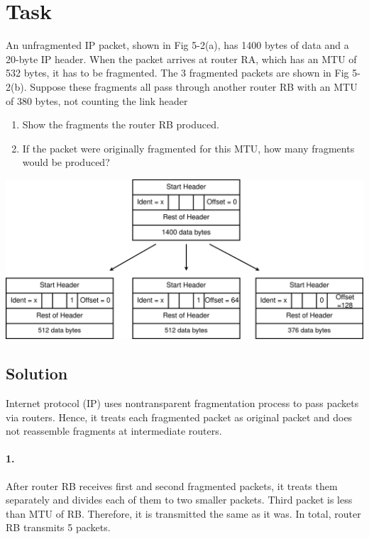 \documentclass[11pt]{article}
\begin{document}
    \section{Task}\label{sec:task-4}
    An unfragmented IP packet, shown in Fig 5-2(a), has 1400 bytes of data and a 20-byte IP header.
    When the packet arrives at router RA, which has an MTU of 532 bytes, it has to be fragmented.
    The 3 fragmented packets are shown in Fig 5-2(b).
    Suppose these fragments all pass through another router RB with an MTU of 380 bytes, not counting the link header
    \begin{enumerate}
        \item Show the fragments the router RB produced.
        \item If the packet were originally fragmented for this MTU, how many fragments would be produced?
    \end{enumerate}

    \begin{center}
        \includegraphics[width=1\textwidth]{figs/Task4}
    \end{center}

    \newpage

    \subsection{Solution}
    Internet protocol (IP) uses nontransparent fragmentation process to pass packets via routers.
    Hence, it treats each fragmented packet as original packet and does not reassemble fragments at intermediate routers.

    \paragraph{1.} After router RB receives first and second fragmented packets, it treats them separately and
    divides each of them to two smaller packets.
    Third packet is less than MTU of RB. Therefore, it is transmitted the same as it was.
    In total, router RB transmits 5 packets.
\end{document}
